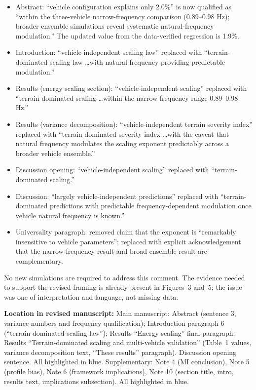 \documentclass[11pt]{article}
\newcommand{\revloc}[1]{\noindent\textbf{Location in revised manuscript:} #1\medskip}
\begin{document}
\begin{itemize}[leftmargin=*]
\item Abstract: ``vehicle configuration explains only 2.0\%'' is now qualified as ``within the three-vehicle narrow-frequency comparison (0.89--0.98 Hz); broader ensemble simulations reveal systematic natural-frequency modulation.'' The updated value from the data-verified regression is 1.9\%.
\item Introduction: ``vehicle-independent scaling law'' replaced with ``terrain-dominated scaling law \ldots with natural frequency providing predictable modulation.''
\item Results (energy scaling section): ``vehicle-independent scaling'' replaced with ``terrain-dominated scaling \ldots within the narrow frequency range 0.89--0.98 Hz.''
\item Results (variance decomposition): ``vehicle-independent terrain severity index'' replaced with ``terrain-dominated severity index \ldots with the caveat that natural frequency modulates the scaling exponent predictably across a broader vehicle ensemble.''
\item Discussion opening: ``vehicle-independent scaling'' replaced with ``terrain-dominated scaling.''
\item Discussion: ``largely vehicle-independent predictions'' replaced with ``terrain-dominated predictions with predictable frequency-dependent modulation once vehicle natural frequency is known.''
\item Universality paragraph: removed claim that the exponent is ``remarkably insensitive to vehicle parameters''; replaced with explicit acknowledgement that the narrow-frequency result and broad-ensemble result are complementary.
\end{itemize}

No new simulations are required to address this comment. The evidence needed to support the revised framing is already present in Figures~3 and~5; the issue was one of interpretation and language, not missing data.

\revloc{Main manuscript: Abstract (sentence 3, variance numbers and frequency qualification); Introduction paragraph 6 (``terrain-dominated scaling law''); Results ``Energy scaling'' final paragraph; Results ``Terrain-dominated scaling and multi-vehicle validation'' (Table~1 values, variance decomposition text, ``These results'' paragraph). Discussion opening sentence. All highlighted in blue. Supplementary: Note 4 (MI conclusion), Note 5 (profile bias), Note 6 (framework implications), Note 10 (section title, intro, results text, implications subsection). All highlighted in blue.}
\end{document}
